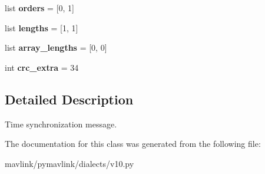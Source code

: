 \begin{DoxyCompactItemize}
list {\bfseries orders} = \mbox{[}0, 1\mbox{]}
\item 
\mbox{\label{classpymavlink_1_1dialects_1_1v10_1_1MAVLink__timesync__message_a9d1c35d8d84a7e79ffd6092ccad05ae0}} 
list {\bfseries lengths} = \mbox{[}1, 1\mbox{]}
\item 
\mbox{\label{classpymavlink_1_1dialects_1_1v10_1_1MAVLink__timesync__message_ac8c3a6c9d2d0e589235dcea935282bb2}} 
list {\bfseries array\+\_\+lengths} = \mbox{[}0, 0\mbox{]}
\item 
\mbox{\label{classpymavlink_1_1dialects_1_1v10_1_1MAVLink__timesync__message_add97b3f9b188bd1987b95cd65c66f2a7}} 
int {\bfseries crc\+\_\+extra} = 34
\end{DoxyCompactItemize}


\subsection{Detailed Description}
\begin{DoxyVerb}Time synchronization message.
\end{DoxyVerb}
 

The documentation for this class was generated from the following file\+:\begin{DoxyCompactItemize}
\item 
mavlink/pymavlink/dialects/v10.\+py\end{DoxyCompactItemize}
